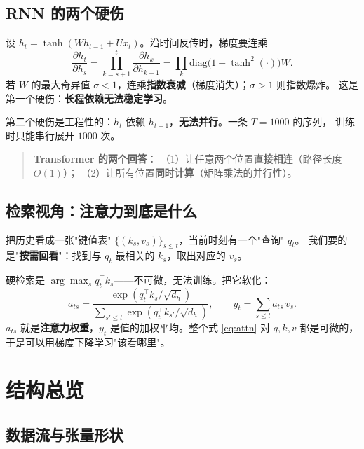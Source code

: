 \documentclass[11pt,a4paper]{ctexart}
\begin{document}
\subsection{RNN 的两个硬伤}

设 $h_t=\tanh(Wh_{t-1}+Ux_t)$。沿时间反传时，梯度要连乘
\begin{equation}
  \frac{\partial h_t}{\partial h_s}=\prod_{k=s+1}^{t}\frac{\partial h_k}{\partial h_{k-1}}
  =\prod_{k}\mathrm{diag}\big(1-\tanh^2(\cdot)\big)W .
\end{equation}
若 $W$ 的最大奇异值 $\sigma<1$，连乘\textbf{指数衰减}（梯度消失）；$\sigma>1$ 则指数爆炸。
这是第一个硬伤：\textbf{长程依赖无法稳定学习}。

第二个硬伤是工程性的：$h_t$ 依赖 $h_{t-1}$，\textbf{无法并行}。一条 $T=1000$ 的序列，
训练时只能串行展开 $1000$ 次。

\begin{quote}
\textbf{Transformer 的两个回答}：
（1）让任意两个位置\textbf{直接相连}（路径长度 $O(1)$）；
（2）让所有位置\textbf{同时计算}（矩阵乘法的并行性）。
\end{quote}

\subsection{检索视角：注意力到底是什么}

把历史看成一张"键值表" $\{(k_s,v_s)\}_{s\le t}$，当前时刻有一个"查询" $q_t$。
我们要的是"\textbf{按需回看}"：找到与 $q_t$ 最相关的 $k_s$，取出对应的 $v_s$。

硬检索是 $\arg\max_s q_t^\top k_s$——不可微，无法训练。把它软化：
\begin{equation}
  a_{ts}=\frac{\exp(q_t^\top k_s/\sqrt{d_h})}{\sum_{s'\le t}\exp(q_t^\top k_{s'}/\sqrt{d_h})},
  \qquad
  y_t=\sum_{s\le t}a_{ts}\,v_s .
  \label{eq:attn}
\end{equation}
$a_{ts}$ 就是\textbf{注意力权重}，$y_t$ 是值的加权平均。整个式 \eqref{eq:attn} 对
$q,k,v$ 都是可微的，于是可以用梯度下降学习"该看哪里"。

\section{结构总览}

\subsection{数据流与张量形状}
\end{document}
